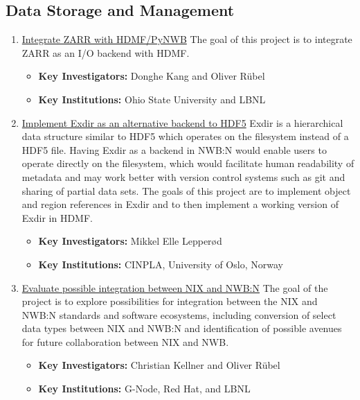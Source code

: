 \documentclass{article}
\begin{document}
\subsection{Data Storage and Management}

\begin{enumerate}
    \setcounter{enumi}{\theprojectEnumCounter}  %
    \item \href{https://neurodatawithoutborders.github.io/nwb_hackathons/HCK06_2019_Janelia/projects/ZARR/}{Integrate ZARR with HDMF/PyNWB}  The goal of this project is to integrate ZARR as an I/O backend with HDMF.
        \vspace{-0.2cm}
        \begin{itemize}[noitemsep]
            \item \textbf{Key Investigators:} Donghe Kang and Oliver R\"ubel
            \item \textbf{Key Institutions:} Ohio State University and LBNL
        \end{itemize}
        
    \item \href{https://neurodatawithoutborders.github.io/nwb_hackathons/HCK06_2019_Janelia/projects/Exdir/}{Implement Exdir as an alternative backend to HDF5}  Exdir is a hierarchical data structure similar to HDF5 which operates on the filesystem instead of a HDF5 file.  Having Exdir as a backend in NWB:N would enable users to operate directly on the filesystem, which would facilitate human readability of metadata and may work better with version control systems such as git and sharing of partial data sets. The goals of this project are to implement object and region references in Exdir and to then implement a working version of Exdir in HDMF. 
        \vspace{-0.2cm}
        \begin{itemize}[noitemsep]
            \item \textbf{Key Investigators:} Mikkel Elle Lepperød
            \item \textbf{Key Institutions:} CINPLA, University of Oslo, Norway
        \end{itemize}
    
    \item \href{https://neurodatawithoutborders.github.io/nwb_hackathons/HCK06_2019_Janelia/projects/NIX/}{Evaluate possible integration between NIX and NWB:N} The goal of the project is to explore possibilities for integration between the NIX and NWB:N standards and software ecosystems, including conversion of select data types between NIX and NWB:N and identification of possible avenues for future collaboration between NIX and NWB. 
        \vspace{-0.2cm}
        \begin{itemize}[noitemsep]
            \item \textbf{Key Investigators:} Christian Kellner and Oliver R\"ubel
            \item \textbf{Key Institutions:} G-Node, Red Hat, and LBNL
        \end{itemize}
    

\end{enumerate}
\end{document}
